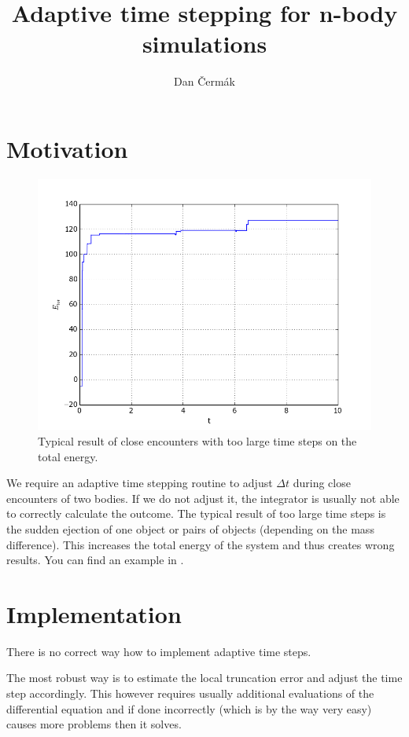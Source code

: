 \documentclass[a4paper,10pt,openany]{article}
\title{Adaptive time stepping for n-body simulations}
\author{Dan Čermák}
\begin{document}
\maketitle

\section{Motivation}

\begin{figure}[h]
\begin{center}
\includegraphics[width=.8\textwidth]{energy_constant_time_step.png}
\end{center}
\caption{Typical result of close encounters with too large time steps on the total energy.}\label{fig:energy constant time step}
\end{figure}

We require an adaptive time stepping routine to adjust $\Delta t$ during close encounters of two bodies. If we do not adjust it, the integrator is usually not able to correctly calculate the outcome. The typical result of too large time steps is the sudden ejection of one object or pairs of objects (depending on the mass difference). This increases the total energy of the system and thus creates wrong results. You can find an example in .


\section{Implementation}

There is no correct way how to implement adaptive time steps.

The most robust way is to estimate the local truncation error and adjust the time step accordingly. This however requires usually additional evaluations of the differential equation and if done incorrectly (which is by the way very easy) causes more problems then it solves.
\end{document}
